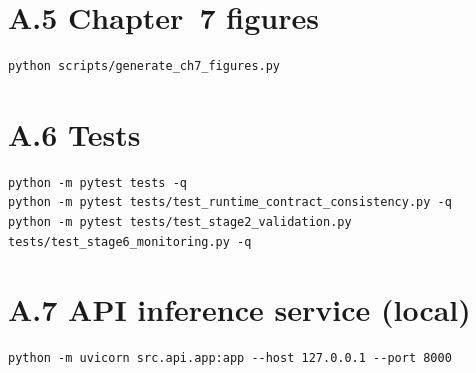 \section*{A.5 Chapter~7 figures}
\begin{footnotesize}
\begin{verbatim}
python scripts/generate_ch7_figures.py
\end{verbatim}
\end{footnotesize}

\section*{A.6 Tests}
\begin{footnotesize}
\begin{verbatim}
python -m pytest tests -q
python -m pytest tests/test_runtime_contract_consistency.py -q
python -m pytest tests/test_stage2_validation.py tests/test_stage6_monitoring.py -q
\end{verbatim}
\end{footnotesize}

\section*{A.7 API inference service (local)}
\begin{footnotesize}
\begin{verbatim}
python -m uvicorn src.api.app:app --host 127.0.0.1 --port 8000
\end{verbatim}
\end{footnotesize}
